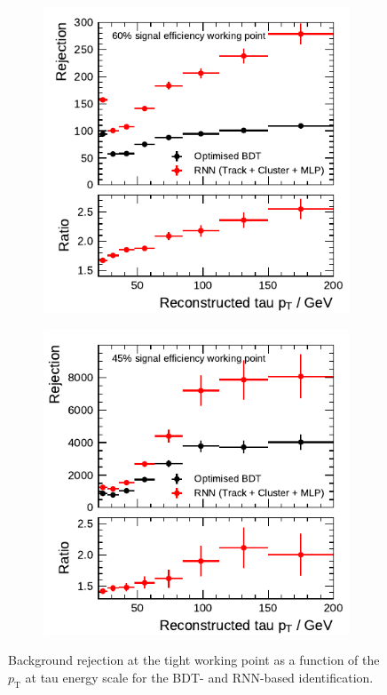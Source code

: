 \begin{figure}[htb]
  \begin{subfigure}[t]{0.48\textwidth}
    \centering
    \includegraphics{./figures/rnn/combined/rnn_tight_1p.pdf}
  \end{subfigure}\hfill
  \begin{subfigure}[t]{0.48\textwidth}
    \centering
    \includegraphics{./figures/rnn/combined/rnn_tight_3p.pdf}
  \end{subfigure}
  \caption{Background rejection at the tight working point as a function of the
    \tauhadvis $p_\text{T}$ at tau energy scale for the BDT- and RNN-based
    identification.}
  \label{fig:combined_working_points}
\end{figure}

